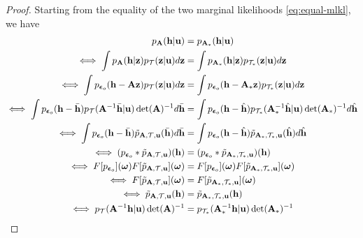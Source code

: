 \documentclass[nohyperref]{article}
\theoremstyle{plain}
\theoremstyle{definition}
\theoremstyle{remark}
\begin{document}
\begin{proof}
    Starting from the equality of the two marginal likelihoods \eqref{eq:equal-mlkl}, we have
    \begin{align}
        p_{\mathbf{A}}(\mathbf{h}|\mathbf{u})&=p_{\mathbf{A}_{*}}(\mathbf{h}|\mathbf{u})\\   
        \iff \int p_{\mathbf{A}}(\mathbf{h}|\mathbf{z})p_{\mathcal{T}}(\mathbf{z}|\mathbf{u})d\mathbf{z} &= \int p_{\mathbf{A}_{*}}(\mathbf{h}|\mathbf{z})p_{\mathcal{T}_{*}}(\mathbf{z}|\mathbf{u})d\mathbf{z}\\
        \iff \int p_{\boldsymbol{\epsilon}_o}(\mathbf{h}-\mathbf{A}\mathbf{z})p_{\mathcal{T}}(\mathbf{z}|\mathbf{u})d\mathbf{z} &= \int p_{\boldsymbol{\epsilon}_o}(\mathbf{h}-\mathbf{A}_{*}\mathbf{z})p_{\mathcal{T}_{*}}(\mathbf{z}|\mathbf{u})d\mathbf{z}\\
        \iff \int p_{\boldsymbol{\epsilon}_o}(\mathbf{h}-\Bar{\mathbf{h}})p_{\mathcal{T}}(\mathbf{A}^{-1}\Bar{\mathbf{h}}|\mathbf{u})\det(\mathbf{A})^{-1}d\Bar{\mathbf{h}} &= \int p_{\boldsymbol{\epsilon}_o}(\mathbf{h}-\Hat{\mathbf{h}})p_{\mathcal{T}_{*}}(\mathbf{A}_{*}^{-1}\Hat{\mathbf{h}}|\mathbf{u})\det(\mathbf{A}_{*})^{-1}d\Hat{\mathbf{h}}\label{eq:reduce-1}\\
        \iff \int p_{\boldsymbol{\epsilon}_o}(\mathbf{h}-\Bar{\mathbf{h}})\Tilde{p}_{\mathbf{A},\mathcal{T},\mathbf{u}}(\Bar{\mathbf{h}})d\Bar{\mathbf{h}} &= \int p_{\boldsymbol{\epsilon}_o}(\mathbf{h}-\Hat{\mathbf{h}})\Tilde{p}_{\mathbf{A}_{*},\mathcal{T}_{*},\mathbf{u}}(\Hat{\mathbf{h}})d\Hat{\mathbf{h}}\label{eq:reduce-2}\\
        \iff (p_{\boldsymbol{\epsilon}_o}*\Tilde{p}_{\mathbf{A},\mathcal{T},\mathbf{u}})(\mathbf{h})&=(p_{\boldsymbol{\epsilon}_o}*\Tilde{p}_{\mathbf{A}_{*},\mathcal{T}_{*},\mathbf{u}})(\mathbf{h})\label{eq:reduce-3}\\
        \iff F[p_{\boldsymbol{\epsilon}_o}](\boldsymbol{\omega})F[\Tilde{p}_{\mathbf{A},\mathcal{T},\mathbf{u}}](\boldsymbol{\omega})&=F[p_{\boldsymbol{\epsilon}_o}](\boldsymbol{\omega})F[\Tilde{p}_{\mathbf{A}_{*},\mathcal{T}_{*},\mathbf{u}}](\boldsymbol{\omega})\label{eq:reduce-4}\\
        \iff F[\Tilde{p}_{\mathbf{A},\mathcal{T},\mathbf{u}}](\boldsymbol{\omega})&=F[\Tilde{p}_{\mathbf{A}_{*},\mathcal{T}_{*},\mathbf{u}}](\boldsymbol{\omega})\label{eq:reduce-5}\\
        \iff \Tilde{p}_{\mathbf{A},\mathcal{T},\mathbf{u}}(\mathbf{h}) &= \Tilde{p}_{\mathbf{A}_{*},\mathcal{T}_{*},\mathbf{u}}(\mathbf{h})\\
        \iff p_{\mathcal{T}}(\mathbf{A}^{-1}\mathbf{h}|\mathbf{u})\det(\mathbf{A})^{-1} &= p_{\mathcal{T}_{*}}(\mathbf{A}_{*}^{-1}\mathbf{h}|\mathbf{u})\det(\mathbf{A}_{*})^{-1}\\

\end{align}
\end{proof}
\end{document}
